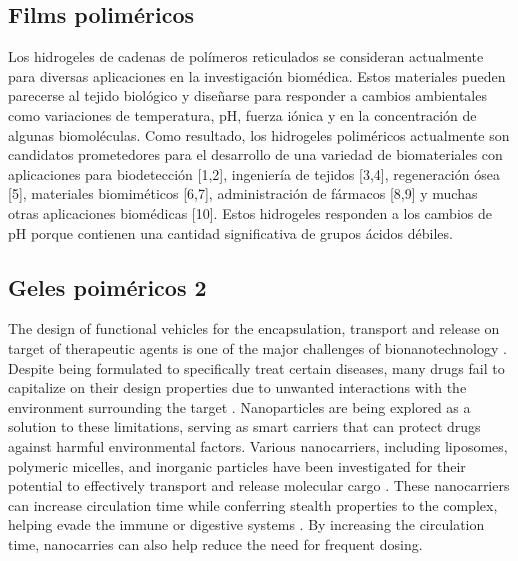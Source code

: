 \subsection{Films poliméricos}

Los hidrogeles de cadenas de polímeros reticulados se consideran actualmente para diversas aplicaciones en la investigación biomédica.%
 Estos materiales pueden parecerse al tejido biol\'ogico y dise\~narse para responder a cambios ambientales como variaciones de temperatura, pH, fuerza i\'onica y en la concentraci\'on de algunas biomol\'eculas. Como resultado, los hidrogeles polim\'ericos actualmente son candidatos prometedores para el desarrollo de una variedad de biomateriales con aplicaciones para biodetección [1,2], ingenier\'ia de tejidos [3,4], regeneraci\'on \'osea [5], materiales biomim\'eticos [6,7], administraci\'on de f\'armacos [8,9] y muchas otras aplicaciones biom\'edicas [10].
Estos hidrogeles responden a los cambios de pH porque contienen una cantidad significativa de grupos ácidos débiles.

\subsection{Geles poim\'ericos 2}
The design of functional vehicles for the encapsulation, transport and release on target of therapeutic agents is one of the major challenges of bionanotechnology \addcite[ye2018review].
Despite being formulated to specifically treat certain diseases, many drugs fail to capitalize on their design properties due to  unwanted interactions with the environment surrounding the target .
Nanoparticles are being explored as a solution to these limitations, serving as smart carriers that can  protect drugs against harmful environmental factors.
Various nanocarriers, including liposomes, polymeric micelles, and inorganic particles have been investigated for their potential to effectively transport and release molecular cargo .
These nanocarriers can increase circulation time while conferring stealth properties to the complex, helping evade the immune or digestive systems .
By increasing the circulation time, nanocarries can also help reduce the need for frequent dosing.


